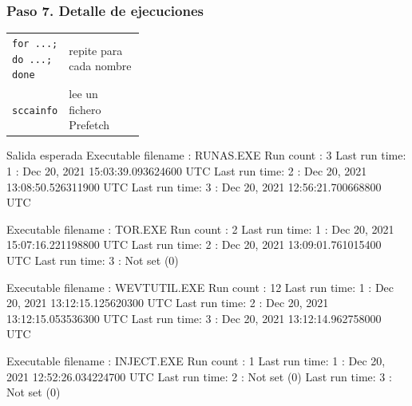 \documentclass[11pt,a4paper]{article}
\begin{document}
\subsubsection*{Paso 7. Detalle de ejecuciones}
\begin{tcolorbox}[enhanced, breakable, colback=white, colframe=gray!40, boxrule=0.3pt, arc=1pt, left=4pt, right=4pt, top=2pt, bottom=2pt, fonttitle=\sffamily\scriptsize\bfseries, coltitle=black!75, colbacktitle=gray!8, title={Qué hace cada parte}, attach title to upper, before skip=2pt, after skip=4pt, fontupper=\small]
\par{\renewcommand{\arraystretch}{1.12}\begin{tabularx}{\linewidth}{@{}>{\raggedright\arraybackslash}p{0.33\linewidth}>{\raggedright\arraybackslash}X@{}}
\texttt{for ...; do ...; done} & repite para cada nombre \\
\texttt{sccainfo} & lee un fichero Prefetch \\
\end{tabularx}}
\end{tcolorbox}
\begin{salidan}{Salida esperada}
        Executable filename             : RUNAS.EXE
        Run count                       : 3
        Last run time: 1                : Dec 20, 2021 15:03:39.093624600 UTC
        Last run time: 2                : Dec 20, 2021 13:08:50.526311900 UTC
        Last run time: 3                : Dec 20, 2021 12:56:21.700668800 UTC

        Executable filename             : TOR.EXE
        Run count                       : 2
        Last run time: 1                : Dec 20, 2021 15:07:16.221198800 UTC
        Last run time: 2                : Dec 20, 2021 13:09:01.761015400 UTC
        Last run time: 3                : Not set (0)

        Executable filename             : WEVTUTIL.EXE
        Run count                       : 12
        Last run time: 1                : Dec 20, 2021 13:12:15.125620300 UTC
        Last run time: 2                : Dec 20, 2021 13:12:15.053536300 UTC
        Last run time: 3                : Dec 20, 2021 13:12:14.962758000 UTC

        Executable filename             : INJECT.EXE
        Run count                       : 1
        Last run time: 1                : Dec 20, 2021 12:52:26.034224700 UTC
        Last run time: 2                : Not set (0)
        Last run time: 3                : Not set (0)
\end{salidan}
\end{document}
